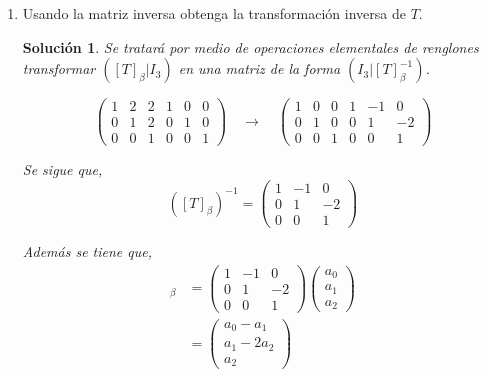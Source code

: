 \documentclass[letterpaper]{article}
\newtheorem*{sol}{Solución}
\begin{document}
\begin{enumerate}
\begin{enumerate}[label=(\alph*)]
    \item Usando la matriz inversa obtenga la transformación inversa de $T$.
    \begin{sol}
    Se tratará por medio de operaciones elementales de renglones transformar $([T]_\beta | I_3)$ en una
    matriz de la forma $(I_3 | [T]_\beta^{-1})$.

    \[
        \left(
        \begin{array}{ccc|ccc}
            1 & 2 & 2 & 1 & 0 & 0 \\
            0 & 1 & 2 & 0 & 1 & 0 \\
            0 & 0 & 1 & 0 & 0 & 1
        \end{array}
        \right)
        \quad\longrightarrow\quad
        \left(
        \begin{array}{ccc|ccc}
            1 & 0 & 0 & 1 & -1 & 0 \\
            0 & 1 & 0 & 0 & 1 & -2 \\
            0 & 0 & 1 & 0 & 0 & 1
        \end{array}
        \right)
    \]

    Se sigue que,
    \[
        ([T]_\beta)^{-1} =
        \begin{pmatrix}
            1 & -1 & 0\\ 
            0 & 1 & -2\\ 
            0 & 0 & 1
        \end{pmatrix}
    \]

    Además se tiene que,
    \begin{align*}
        [T^{-1}(a_0 + a_1x + a_2 x^2)]_\beta
            &= \begin{pmatrix}
                    1 & -1 & 0\\ 
                    0 & 1 & -2\\ 
                    0 & 0 & 1
                \end{pmatrix}
                \begin{pmatrix}
                    a_0\\ 
                    a_1\\
                    a_2
                \end{pmatrix}\\
            &= \begin{pmatrix}
                    a_0 - a_1\\
                    a_1 - 2a_2\\
                    a_2
                \end{pmatrix}
    \end{align*}


\end{sol}
\end{enumerate}
\end{enumerate}
\end{document}
